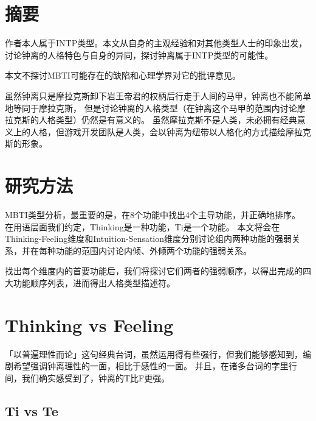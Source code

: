 \documentclass[a4paper,11pt]{article}
\begin{document}
\fulldoctitle


\section*{摘要}

作者本人属于INTP类型。本文从自身的主观经验和对其他类型人士的印象出发，讨论钟离的人格特色与自身的异同，探讨钟离属于INTP类型的可能性。

本文不探讨MBTI可能存在的缺陷和心理学界对它的批评意见。

虽然钟离只是摩拉克斯卸下岩王帝君的权柄后行走于人间的马甲，钟离也不能简单地等同于摩拉克斯，
但是讨论钟离的人格类型（在钟离这个马甲的范围内讨论摩拉克斯的人格类型）仍然是有意义的。
虽然摩拉克斯不是人类，未必拥有经典意义上的人格，但游戏开发团队是人类，会以钟离为纽带以人格化的方式描绘摩拉克斯的形象。











\section{研究方法}

MBTI类型分析，最重要的是，在8个功能中找出4个主导功能，并正确地排序。
在用语层面我们约定，Thinking是一种功能，Ti是一个功能。
本文将会在Thinking-Feeling维度和Intuition-Sensation维度分别讨论组内两种功能的强弱关系，并在每种功能的范围内讨论内倾、外倾两个功能的强弱关系。

找出每个维度内的首要功能后，我们将探讨它们两者的强弱顺序，以得出完成的四大功能顺序列表，进而得出人格类型描述符。










\section{Thinking vs Feeling}

「以普遍理性而论」这句经典台词，虽然运用得有些强行，但我们能够感知到，编剧希望强调钟离理性的一面，相比于感性的一面。
并且，在诸多台词的字里行间，我们确实感受到了，钟离的T比F更强。

\subsection{Ti vs Te}
\end{document}
